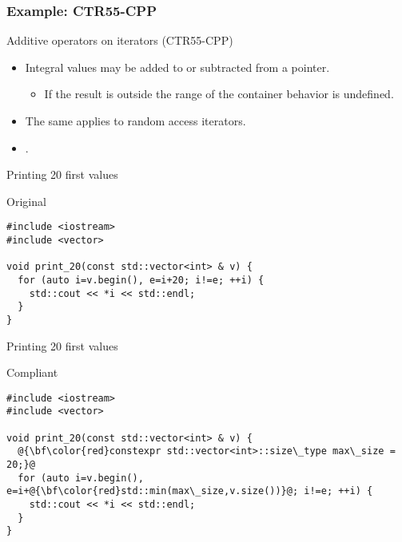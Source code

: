 \subsubsection{Example: CTR55-CPP}

\begin{frame}[t]{Additive operators on iterators (CTR55-CPP)}
\begin{itemize}
  \item Integral values may be added to or subtracted from a pointer.
    \begin{itemize}
      \item If the result is outside the range of the container behavior is undefined.
    \end{itemize}

  \vfill
  \item The same applies to random access iterators.

  \vfill
  \item {}.
\end{itemize}
\end{frame}

\begin{frame}[t,fragile]{Printing 20 first values}
\begin{block}{Original}
\begin{lstlisting}
#include <iostream>
#include <vector>

void print_20(const std::vector<int> & v) {
  for (auto i=v.begin(), e=i+20; i!=e; ++i) {
    std::cout << *i << std::endl;
  }
}
\end{lstlisting}
\end{block}
\end{frame}

\begin{frame}[t,fragile]{Printing 20 first values}
\begin{block}{Compliant}
\begin{lstlisting}[escapechar=@]
#include <iostream>
#include <vector>

void print_20(const std::vector<int> & v) {
  @{\bf\color{red}constexpr std::vector<int>::size\_type max\_size = 20;}@
  for (auto i=v.begin(), e=i+@{\bf\color{red}std::min(max\_size,v.size())}@; i!=e; ++i) {
    std::cout << *i << std::endl;
  }
}
\end{lstlisting}
\end{block}

\end{frame}


